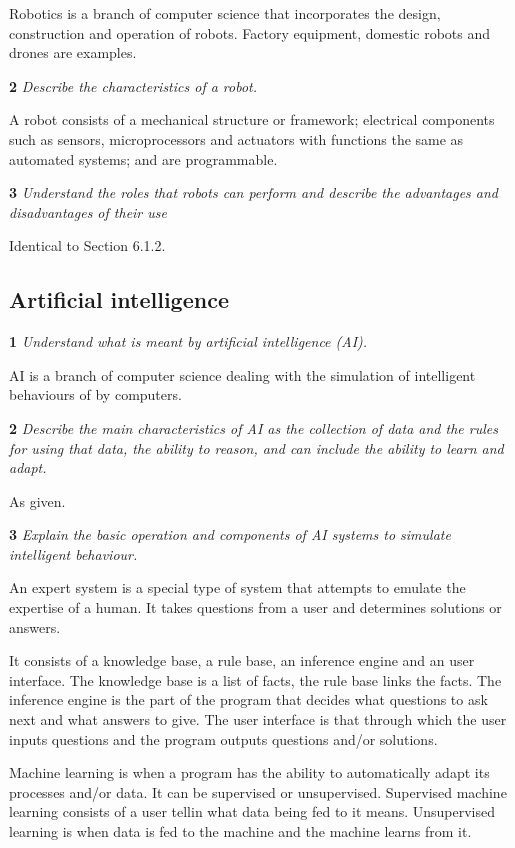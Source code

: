Robotics is a branch of computer science that incorporates the design, construction and operation
of robots. Factory equipment, domestic robots and drones are examples.

\bigskip

\noindent\textbf{2} \textit{Describe the characteristics of a robot.}

A robot consists of a mechanical structure or framework; electrical components such as sensors,
microprocessors and actuators with functions the same as automated systems; and are programmable.

\bigskip

\noindent\textbf{3} \textit{Understand the roles that robots can perform
and describe the advantages and disadvantages
of their use}

Identical to Section 6.1.2.

\subsection{Artificial intelligence}
\noindent\textbf{1} \textit{Understand what is meant by artificial intelligence (AI).}

AI is a branch of computer science dealing with the simulation of intelligent behaviours of by
computers.

\bigskip

\noindent\textbf{2} \textit{Describe the main characteristics of AI as the
collection of data and the rules for using that
data, the ability to reason, and can include the
ability to learn and adapt.}

As given.

\bigskip

\noindent\textbf{3} \textit{Explain the basic operation and components of AI
systems to simulate intelligent behaviour.}

An expert system is a special type of system that attempts to emulate the expertise of a human.
It takes questions from a user and determines solutions or answers.

It consists of a knowledge base, a rule base, an inference engine and an user interface. The
knowledge base is a list of facts, the rule base links the facts. The inference engine is the
part of the program that decides what questions to ask next and what answers to give. The user
interface is that through which the user inputs questions and the program outputs questions and/or
solutions.

\medskip

Machine learning is when a program has the ability to automatically adapt its processes and/or 
data. It can be supervised or unsupervised. Supervised machine learning consists of a user tellin
what data being fed to it means. Unsupervised learning is when data is fed to the machine and the
machine learns from it.

